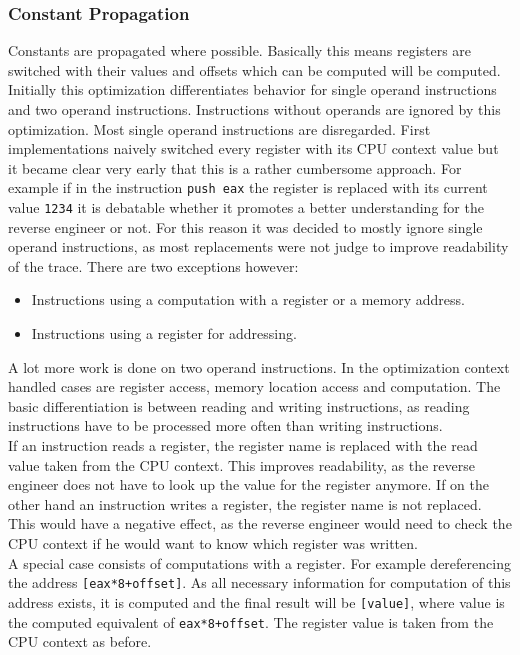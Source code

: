 \documentclass[10pt,twoside,a4paper,bibliography=totoc]{scrbook}
\newcommand{\code}[1]{\texttt{#1}}
\begin{document}
\subsubsection{Constant Propagation} 
Constants are propagated where possible. Basically this means registers are switched with their values and offsets which can be computed will be computed.\\
Initially this optimization differentiates behavior for single operand instructions and two operand instructions. Instructions without operands are ignored by this optimization.
Most single operand instructions are disregarded. 
First implementations naively switched every register with its CPU context value but it became clear very early that this is a rather cumbersome approach. 
For example if in the instruction \code{push eax} the register is replaced with its current value \code{1234} it is debatable whether it promotes a better understanding for the reverse engineer or not. 
For this reason it was decided to mostly ignore single operand instructions, as most replacements were not judge to improve readability of the trace. There are two exceptions however:
\begin{itemize}
\item{Instructions using a computation with a register or a memory address.}
\item{Instructions using a register for addressing.}
\end{itemize}
A lot more work is done on two operand instructions. In the optimization context handled cases are register access, memory location access and computation.
The basic differentiation is between reading and writing instructions, as reading instructions have to be processed more often than writing instructions.\\
If an instruction reads a register, the register name is replaced with the read value taken from the CPU context. This improves readability, as the reverse engineer does not have to look up the value for the register anymore.
If on the other hand an instruction writes a register, the register name is not replaced. This would have a negative effect, as the reverse engineer would need to check the CPU context if he would want to know which register was written.\\
A special case consists of computations with a register. For example dereferencing the address \code{[eax*8+offset]}. 
As all necessary information for computation of this address exists, it is computed and the final result will be \code{[value]}, where value is the computed equivalent of \code{eax*8+offset}. The register value is taken from the CPU context as before.\\
\end{document}
